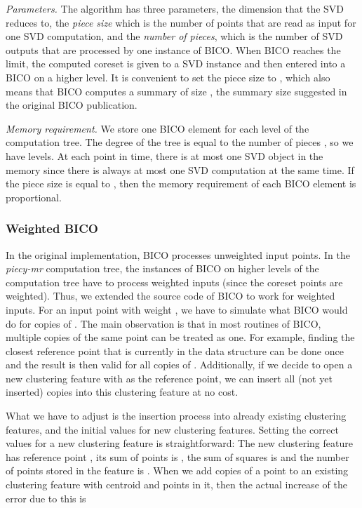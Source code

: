 \documentclass[a4paper]{scrartcl}
\begin{document}
\emph{Parameters.} The algorithm has three parameters, the dimension that the SVD reduces to, the \emph{piece size} which is the number of points that are read as input for one SVD computation, and the \emph{number of pieces}, which is the number of SVD outputs that are processed by one instance of BICO. When BICO reaches the limit, the computed coreset is given to a SVD instance and then entered into a BICO on a higher level. It is convenient to set the piece size to , which also means that BICO computes a summary of size , the summary size suggested in the original BICO publication.

\emph{Memory requirement.} We store one BICO element for each level of the computation tree. The degree of the tree is equal to the number of pieces , so we have  levels. At each point in time, there is at most one SVD object in the memory since there is always at most one SVD computation at the same time. If the piece size is equal to , then the memory requirement of each BICO element is proportional.

\subsubsection{Weighted BICO}

In the original implementation, BICO processes unweighted input points. In the \emph{piecy-mr} computation tree, the instances of BICO on higher levels of the computation tree have to process weighted inputs (since the coreset points are weighted). Thus, we extended the source code of BICO to work for weighted inputs. For an input point  with weight , we have to simulate what BICO would do for  copies of . The main observation is that in most routines of BICO, multiple copies of the same point can be treated as one. For example, finding the closest reference point that is currently in the data structure can be done once and the result is then valid for all copies of . Additionally, if we decide to open a new clustering feature with  as the reference point, we can insert all (not yet inserted) copies into this clustering feature at no cost.

What we have to adjust is the insertion process into already existing clustering features, and the initial values for new clustering features.
Setting the correct values for a new clustering feature is straightforward: The new clustering feature has reference point , its sum of points is , the sum of squares is  and the number of points stored in the feature is . When we add  copies of a point  to an existing clustering feature with centroid  and  points in it, then the actual increase of the error due to this is
\end{document}
